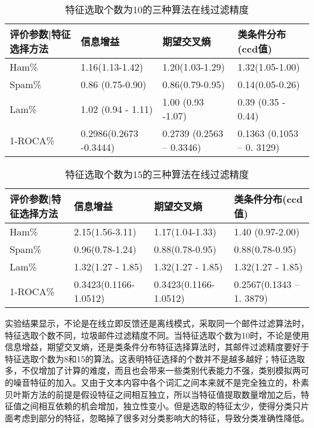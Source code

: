 \begin{table}[!htbp]
\centering
\begin{tabular}{|p{3cm}|p{3cm}|p{3cm}|p{3cm}|}%
\hline  %
评价参数|特征选择方法&信息增益&期望交叉熵&类条件分布(ccd值)\\
\hline  %
Ham\%&1.16(1.13-1.42)&1.20(1.03-1.29)&1.32(1.05-1.00)\\
\hline %
Spam\%&0.86 (0.75-0.90)&0.86(0.79-0.95)&0.14(0.05-0.26)\\
\hline %
Lam\%&1.02 (0.94 - 1.11)&1.00 (0.93 -1.07)&0.39 (0.35 - 0.44)\\
\hline %
1-ROCA\%&0.2986(0.2673 -0.3444)&0.2739 (0.2563 – 0.3346)&0.1363 (0.1053 – 0.
3129)\\
\hline %
\end{tabular}
\caption{特征选取个数为10的三种算法在线过滤精度}
\end{table}


\begin{table}[!htbp]
\centering
\begin{tabular}{|p{3cm}|p{3cm}|p{3cm}|p{3cm}|}%
\hline  %
评价参数|特征选择方法&信息增益&期望交叉熵&类条件分布(ccd值)\\
\hline  %
Ham\%&2.15(1.56-3.11)&1.17(1.04-1.33)&1.40 (0.97-2.00)\\
\hline %
Spam\%&0.96(0.78-1.24)&0.88(0.78-0.95)&0.88(0.78-0.95)\\
\hline %
Lam\%&1.32(1.27 - 1.85)&1.32(1.27 - 1.85)&1.32(1.27 - 1.85)\\
\hline %
1-ROCA\%&0.3423(0.1166- 1.0512)&0.3423(0.1166- 1.0512)&0.2567(0.1343 – 1.
3879)\\
\hline %
\end{tabular}
\caption{特征选取个数为15的三种算法在线过滤精度}
\end{table}

\newpage
实验结果显示，不论是在线立即反馈还是离线模式，采取同一个邮件过滤算法时，特征选取个数不同，垃圾邮件过滤精度不同。当特征选取个数为10时，不论是使用信息增益，期望交叉熵，还是类条件分布特征选择算法时，其邮件过滤精度要好于特征选取个数为8和15的算法。这表明特征选择的个数并不是越多越好；特征选取多，不仅增加了计算的难度，而且也会带来一些类别代表能力不强，类别模拟两可的噪音特征的加入。又由于文本内容中各个词汇之间本来就不是完全独立的，朴素贝叶斯方法的前提是假设特征之间相互独立，所以当特征值提取数量增加之后，特征值之间相互依赖的机会增加，独立性变小。但是选取的特征太少，使得分类只片面考虑到部分的特征，忽略掉了很多对分类影响大的特征，导致分类准确性降低。

